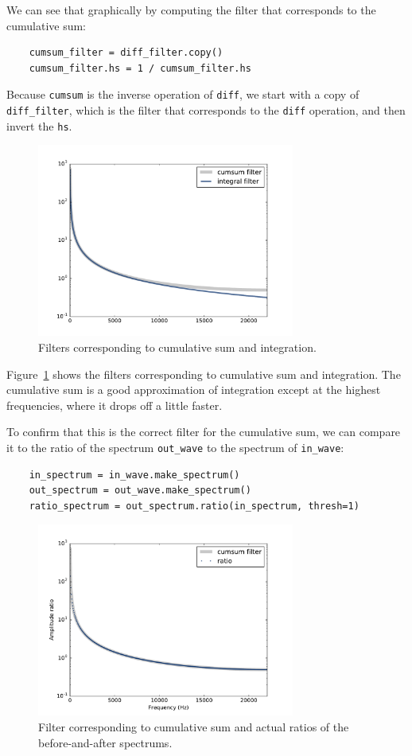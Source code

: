 \documentclass[12pt]{book}
\begin{document}
We can see that graphically by computing the filter that corresponds
to the cumulative sum:

\begin{verbatim}
    cumsum_filter = diff_filter.copy()
    cumsum_filter.hs = 1 / cumsum_filter.hs
\end{verbatim}

Because {\tt cumsum} is the inverse operation of {\tt diff}, we
start with a copy of \verb"diff_filter", which is the filter
that corresponds to the {\tt diff} operation, and then invert the
{\tt hs}.

\begin{figure}
\centerline{\includegraphics[height=2.5in]{figs/diff_int8.pdf}}
\caption{Filters corresponding to cumulative sum and integration.}
\label{fig.diff_int8}
\end{figure}

Figure~\ref{fig.diff_int8} shows the filters corresponding to
cumulative sum and integration.  The cumulative sum is a good
approximation of integration except at the highest frequencies,
where it drops off a little faster.

To confirm that this is the correct filter for the cumulative
sum, we can compare it to the ratio of the spectrum
\verb"out_wave" to the spectrum of \verb"in_wave":

\begin{verbatim}
    in_spectrum = in_wave.make_spectrum()
    out_spectrum = out_wave.make_spectrum()
    ratio_spectrum = out_spectrum.ratio(in_spectrum, thresh=1)
\end{verbatim}

\begin{figure}
\centerline{\includegraphics[height=2.5in]{figs/diff_int9.pdf}}
\caption{Filter corresponding to cumulative sum and actual ratios of
  the before-and-after spectrums.}
\label{fig.diff_int9}
\end{figure}
\end{document}
